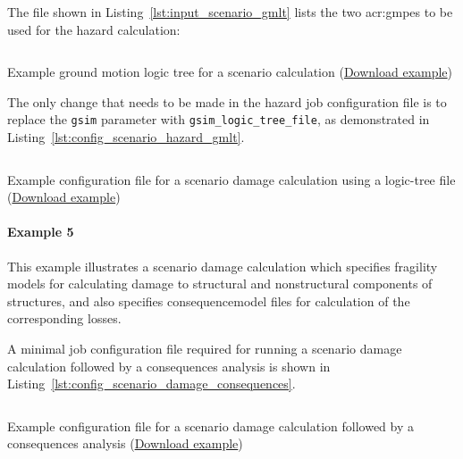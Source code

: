 The file shown in Listing~\ref{lst:input_scenario_gmlt} lists the two
\glspl{acr:gmpe} to be used for the hazard calculation:

\begin{listing}[htbp]
  \inputminted[firstline=1,firstnumber=1,fontsize=\footnotesize,frame=single,linenos,bgcolor=lightgray,label=gsim\_logic\_tree.xml]{xml}{oqum/risk/verbatim/input_scenario_gmlt.xml}
  \caption{Example ground motion logic tree for a scenario calculation (\href{https://raw.githubusercontent.com/gem/oq-engine/master/doc/manual/oqum/risk/verbatim/input_scenario_gmlt.xml}{Download example})}
  \label{lst:input_scenario_gmlt}
\end{listing}

The only change that needs to be made in the hazard job configuration file is
to replace the \Verb+gsim+ parameter with \Verb+gsim_logic_tree_file+, as
demonstrated in Listing~\ref{lst:config_scenario_hazard_gmlt}.

\begin{listing}[htbp]
  \inputminted[firstline=1,firstnumber=1,fontsize=\footnotesize,frame=single,linenos,bgcolor=lightgray,label=job\_hazard.ini]{ini}{oqum/risk/verbatim/config_scenario_hazard_gmlt.ini}
  \caption{Example configuration file for a scenario damage calculation using a logic-tree file (\href{https://raw.githubusercontent.com/gem/oq-engine/master/doc/manual/oqum/risk/verbatim/config_scenario_hazard_gmlt.ini}{Download example})}
  \label{lst:config_scenario_hazard_gmlt}
\end{listing}


\paragraph{Example 5}

This example illustrates a scenario damage calculation which specifies
fragility models for calculating damage to structural and nonstructural
components of structures, and also specifies \gls{consequencemodel} files for
calculation of the corresponding losses.

A minimal job configuration file required for running a scenario damage
calculation followed by a consequences analysis is shown in
Listing~\ref{lst:config_scenario_damage_consequences}.

\begin{listing}[htbp]
  \inputminted[firstline=1,firstnumber=1,fontsize=\footnotesize,frame=single,linenos,bgcolor=lightgray,label=job.ini]{ini}{oqum/risk/verbatim/config_scenario_damage_consequences.ini}
  \caption{Example configuration file for a scenario damage calculation followed by a consequences analysis (\href{https://raw.githubusercontent.com/gem/oq-engine/master/doc/manual/oqum/risk/verbatim/config_scenario_damage_consequences.ini}{Download example})}
  \label{lst:config_scenario_damage_consequences}
\end{listing}

